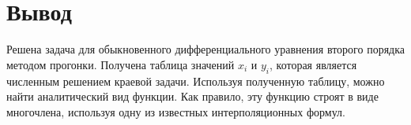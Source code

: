 
\section{Вывод}
Решена задача для обыкновенного дифференциального уравнения второго порядка методом прогонки. Получена таблица значений \(x_i\) и \(y_i\), которая является численным решением краевой задачи. Используя полученную таблицу, можно найти аналитический вид функции. Как правило, эту функцию строят в виде многочлена, используя одну из известных интерполяционных формул.
